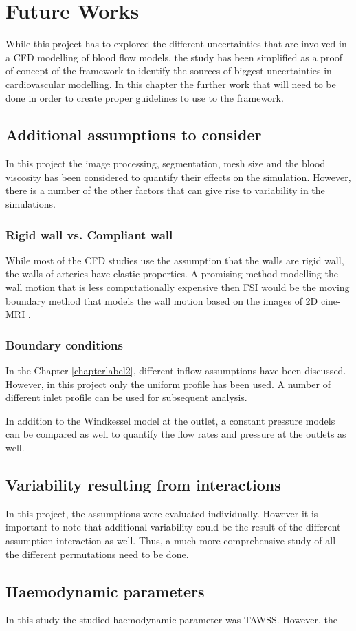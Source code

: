 \chapter{Future Works}
\label{chapterlabel9}

While this project has to explored the different uncertainties that are involved in a CFD modelling of blood flow models, the study has been simplified as a proof of concept of the framework to identify the sources of biggest uncertainties in cardiovascular modelling. In this chapter the further work that will need to be done in order to create proper guidelines to use to the framework.

\section{Additional assumptions to consider}
In this project the image processing, segmentation, mesh size and the blood viscosity has been considered to quantify their effects on the simulation. However, there is a number of the other factors that can give rise to variability in the simulations.

\subsection{Rigid wall vs. Compliant wall}
While most of the CFD studies use the assumption that the walls are rigid wall, the walls of arteries have elastic properties. A promising method modelling the wall motion that is less computationally expensive then FSI would be the moving boundary method that models the wall motion based on the images of 2D cine-MRI \cite{Bonfanti2018AInteraction}. 

\subsection{Boundary conditions}
In the Chapter \ref{chapterlabel2}, different inflow assumptions have been discussed. However, in this project only the uniform profile has been used. A number of different inlet profile can be used for subsequent analysis. \par

In addition to the Windkessel model at the outlet, a constant pressure models can be compared as well to quantify the flow rates and pressure at the outlets as well.

\section{Variability resulting from interactions}
In this project, the assumptions were evaluated individually. However it is important to note that additional variability could be the result of the different assumption interaction as well. Thus, a much more comprehensive study of all the different permutations need to be done.

\section{Haemodynamic parameters}
In this study the studied haemodynamic parameter was TAWSS. However, the 